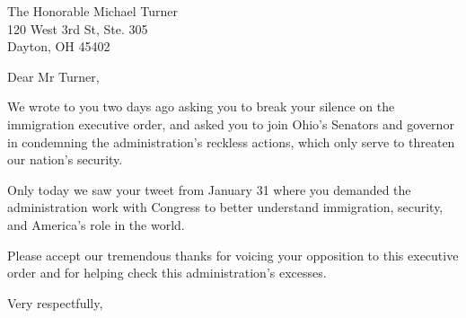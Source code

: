 \documentclass{letter}
\begin{document}
\begin{letter}{
  The Honorable Michael Turner \\
  120 West 3rd St, Ste. 305 \\
  Dayton, OH 45402}

\opening{Dear Mr Turner,}

We wrote to you two days ago asking you to break your silence on the immigration executive order, and asked you to join Ohio's Senators and governor in condemning the administration's reckless actions, which only serve to threaten our nation's security.

Only today we saw your tweet from January 31 where you demanded the administration work with Congress to better understand immigration, security, and America's role in the world.

Please accept our tremendous thanks for voicing your opposition to this executive order and for helping check this administration's excesses.


\closing{Very respectfully,}


\end{letter}
\end{document}
